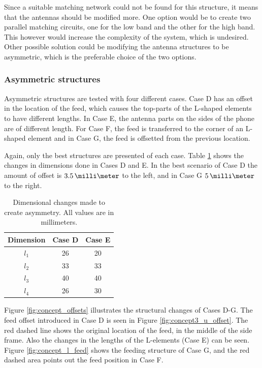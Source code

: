 Since a suitable matching network could not be found for this structure, it means that the antennas should be modified more. One option would be to create two parallel matching circuits, one for the low band and the other for the high band. This however would increase the complexity of the system, which is undesired. Other possible solution could be modifying the antenna structures to be asymmetric, which is the preferable choice of the two options.


\subsubsection{Asymmetric structures}
\label{sec:asymmetric_structures}
Asymmetric structures are tested with four different cases. Case D has an offset in the location of the feed, which causes the top-parts of the L-shaped elements to have different lengths. In Case E, the antenna parts on the sides of the phone are of different length. For Case F, the feed is transferred to the corner of an L-shaped element and in Case G, the feed is offsetted from the previous location.

Again, only the best structures are presented of each case. Table \ref{tab:concept3} shows the changes in dimensions done in Cases D and E. In the best scenario of Case D the amount of offset is $3.5\,\milli\meter$ to the left, and in Case G $5\,\milli\meter$ to the right. 
\begin{table}[H]
    \vspace{-6pt}
    \centering
    \caption{Dimensional changes made to create asymmetry. All values are in millimeters.}
    \label{tab:concept3}
    \vspace{-5pt}
    \begin{tabular}{|c|c|c|}
        \hline
        \textbf{Dimension} & \textbf{Case D} & \textbf{Case E}\\
        \hline
        $l_1$ & 26 & 20 \\
        \hline
        $l_2$ & 33 & 33\\
        \hline
        $l_3$ & 40 & 40\\
        \hline
        $l_4$ & 26 & 30\\
        \hline
    \end{tabular}
\end{table}

Figure \ref{fig:concept_offsets} illustrates the structural changes of Cases D-G. The feed offset introduced in Case D is seen in Figure \ref{fig:concept3_u_offset}. The red dashed line shows the original location of the feed, in the middle of the side frame. Also the changes in the lengths of the L-elements (Case E) can be seen. Figure \ref{fig:concept_l_feed} shows the feeding structure of Case G, and the red dashed area points out the feed position in Case F.

